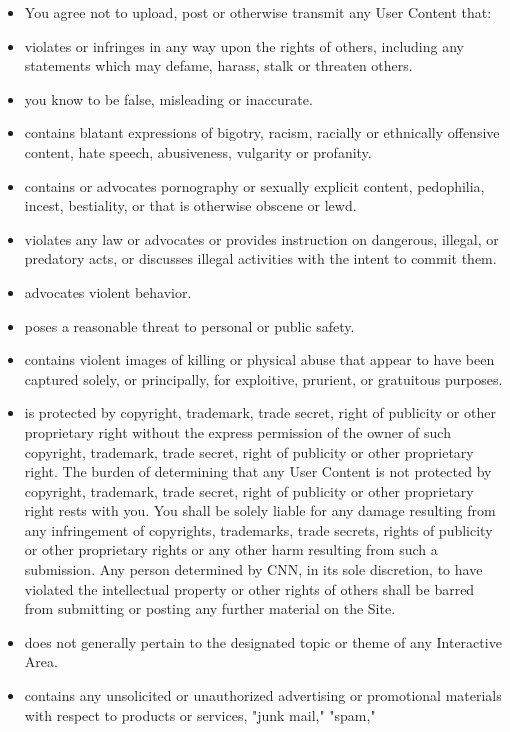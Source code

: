 \begin{itemize}
\tightlist
\item
  You agree not to upload, post or otherwise transmit any User Content
  that:
\item
  violates or infringes in any way upon the rights of others, including
  any statements which may defame, harass, stalk or threaten others.
\item
  you know to be false, misleading or inaccurate.
\item
  contains blatant expressions of bigotry, racism, racially or
  ethnically offensive content, hate speech, abusiveness, vulgarity or
  profanity.
\item
  contains or advocates pornography or sexually explicit content,
  pedophilia, incest, bestiality, or that is otherwise obscene or lewd.
\item
  violates any law or advocates or provides instruction on dangerous,
  illegal, or predatory acts, or discusses illegal activities with the
  intent to commit them.
\item
  advocates violent behavior.
\item
  poses a reasonable threat to personal or public safety.
\item
  contains violent images of killing or physical abuse that appear to
  have been captured solely, or principally, for exploitive, prurient,
  or gratuitous purposes.
\item
  is protected by copyright, trademark, trade secret, right of publicity
  or other proprietary right without the express permission of the owner
  of such copyright, trademark, trade secret, right of publicity or
  other proprietary right. The burden of determining that any User
  Content is not protected by copyright, trademark, trade secret, right
  of publicity or other proprietary right rests with you. You shall be
  solely liable for any damage resulting from any infringement of
  copyrights, trademarks, trade secrets, rights of publicity or other
  proprietary rights or any other harm resulting from such a submission.
  Any person determined by CNN, in its sole discretion, to have violated
  the intellectual property or other rights of others shall be barred
  from submitting or posting any further material on the Site.
\item
  does not generally pertain to the designated topic or theme of any
  Interactive Area.
\item
  contains any unsolicited or unauthorized advertising or promotional
  materials with respect to products or services, "junk mail," "spam,"

\end{itemize}
